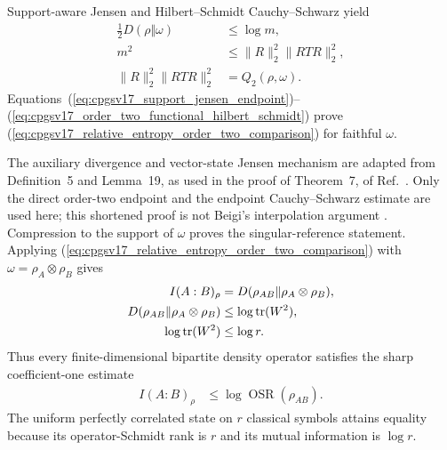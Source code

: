 \documentclass[11pt]{article}
\begin{document}
Support-aware Jensen and Hilbert--Schmidt Cauchy--Schwarz yield
\begin{align}
    \frac12D(\rho\Vert\omega)
        &\leq \log m,
    \label{eq:cpgsv17_support_jensen_endpoint}\\
    m^2
        &\leq
        \lVert R\rVert_2^2
        \lVert RTR\rVert_2^2,
    \label{eq:cpgsv17_half_moment_cauchy_schwarz}\\
    \lVert R\rVert_2^2
        \lVert RTR\rVert_2^2
        &= Q_2(\rho,\omega).
    \label{eq:cpgsv17_order_two_functional_hilbert_schmidt}
\end{align}
Equations~(\ref{eq:cpgsv17_support_jensen_endpoint})--%
(\ref{eq:cpgsv17_order_two_functional_hilbert_schmidt}) prove
(\ref{eq:cpgsv17_relative_entropy_order_two_comparison}) for faithful
$\omega$.

The auxiliary divergence and vector-state Jensen mechanism are adapted from
Definition~5 and Lemma~19, as used in the proof of Theorem~7, of
Ref.~\cite{MullerLennert2013Renyi}. Only the direct order-two endpoint and the
endpoint Cauchy--Schwarz estimate are used here; this shortened proof is not
Beigi's interpolation argument \cite{Beigi2013Sandwiched}. Compression to the
support of $\omega$ proves the singular-reference statement. Applying
(\ref{eq:cpgsv17_relative_entropy_order_two_comparison}) with
$\omega=\rho_A\otimes\rho_B$ gives
\begin{align}
    I(A:B)_\rho
        &= D(\rho_{AB}\Vert\rho_A\otimes\rho_B),
    \label{eq:cpgsv17_mutual_information_relative_entropy}\\
    D(\rho_{AB}\Vert\rho_A\otimes\rho_B)
        &\leq \log\operatorname{tr}(W^2),
    \label{eq:cpgsv17_mutual_information_whitening_bound}\\
    \log\operatorname{tr}(W^2)
        &\leq \log r.
    \label{eq:cpgsv17_mutual_information_osr_bound}
\end{align}
Thus every finite-dimensional bipartite density operator satisfies the sharp
coefficient-one estimate
\begin{align}
    I(A:B)_\rho
        &\leq \log\operatorname{OSR}(\rho_{AB}).
    \label{eq:cpgsv17_coefficient_one_osr_bound}
\end{align}
The uniform perfectly correlated state on $r$ classical symbols attains
equality because its operator-Schmidt rank is $r$ and its mutual information
is $\log r$.
\end{document}
